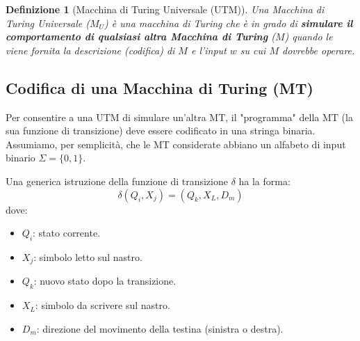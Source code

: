 \documentclass[a4paper, 11pt]{book} %
\newtheorem{definition}[theorem]{Definizione}
\theoremstyle{definition}
\begin{document}
\begin{definition}[Macchina di Turing Universale (UTM)]
Una Macchina di Turing Universale ($M_U$) è una macchina di Turing che è in grado di \textbf{simulare il comportamento di qualsiasi altra Macchina di Turing} ($M$) quando le viene fornita la descrizione (codifica) di $M$ e l'input $w$ su cui $M$ dovrebbe operare.
\end{definition}

\subsection{Codifica di una Macchina di Turing (MT)}

Per consentire a una UTM di simulare un'altra MT, il "programma" della MT (la sua funzione di transizione) deve essere codificato in una stringa binaria. Assumiamo, per semplicità, che le MT considerate abbiano un alfabeto di input binario $\Sigma = \{0,1\}$.

Una generica istruzione della funzione di transizione $\delta$ ha la forma:
\[ \delta(Q_i, X_j) = (Q_k, X_L, D_m) \]
dove:
\begin{itemize}
    \item $Q_i$: stato corrente.
    \item $X_j$: simbolo letto sul nastro.
    \item $Q_k$: nuovo stato dopo la transizione.
    \item $X_L$: simbolo da scrivere sul nastro.
    \item $D_m$: direzione del movimento della testina (sinistra o destra).
\end{itemize}
\end{document}
